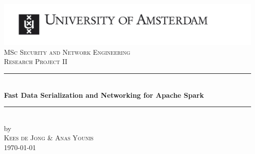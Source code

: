 \documentclass{article}
\begin{document}
\begin{titlepage}

\newcommand{\HRule}{\rule{\linewidth}{0.5mm}}

\begin{center}
\includegraphics[width=\linewidth]{Images/uvaeng}\\[2.5cm]
\textsc{\Large MSc Security and Network Engineering}\\[0.2cm]
\textsc{\Large Research Project II}\\[0.5cm] 

\HRule \\[0.4cm]
{ \huge \bfseries Fast Data Serialization and Networking for Apache Spark}\\[0.4cm]
\HRule \\[0.5cm]
 
by\\[0.2cm]
\textsc{\Large Kees de Jong \& Anas Younis}\\[0.2cm]

{\Large \today}\\[1cm]

\vfill

\end{center}
\end{titlepage}

\tableofcontents
\clearpage








\printbibliography
\end{document}
